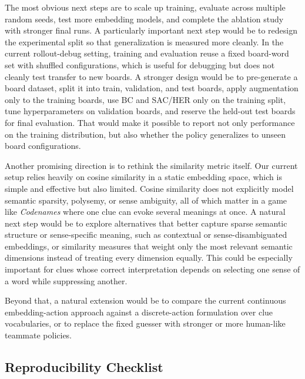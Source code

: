 \documentclass[9pt]{article}
\begin{document}
The most obvious next steps are to scale up training, evaluate across
multiple random seeds, test more embedding models, and complete the
ablation study with stronger final runs. A particularly important next
step would be to redesign the experimental split so that generalization
is measured more cleanly. In the current rollout-debug setting, training
and evaluation reuse a fixed board-word set with shuffled configurations,
which is useful for debugging but does not cleanly test transfer to new
boards. A stronger design would be to pre-generate a board dataset,
split it into train, validation, and test boards, apply augmentation
only to the training boards, use BC and SAC/HER only on the training
split, tune hyperparameters on validation boards, and reserve the held-out
test boards for final evaluation. That would make it possible to report
not only performance on the training distribution, but also whether the
policy generalizes to unseen board configurations.

Another promising direction is to rethink the similarity metric itself.
Our current setup relies heavily on cosine similarity in a static
embedding space, which is simple and effective but also limited. Cosine
similarity does not explicitly model semantic sparsity, polysemy, or
sense ambiguity, all of which matter in a game like \emph{Codenames}
where one clue can evoke several meanings at once. A natural next step
would be to explore alternatives that better capture sparse semantic
structure or sense-specific meaning, such as contextual or
sense-disambiguated embeddings, or similarity measures that weight only
the most relevant semantic dimensions instead of treating every
dimension equally. This could be especially important for clues whose
correct interpretation depends on selecting one sense of a word while
suppressing another.

Beyond that, a natural extension would be to compare the current
continuous embedding-action approach against a discrete-action
formulation over clue vocabularies, or to replace the fixed guesser with
stronger or more human-like teammate policies.

\subsection{Reproducibility Checklist}\label{reproducibility-checklist}
\end{document}
